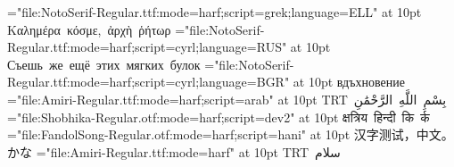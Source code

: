 \font\gr="file:NotoSerif-Regular.ttf:mode=harf;script=grek;language=ELL" at 10pt
\hbox{\gr Καλημέρα κόσμε, ἀρχὴ ῥήτωρ}
\font\cy="file:NotoSerif-Regular.ttf:mode=harf;script=cyrl;language=RUS" at 10pt
\hbox{\cy Съешь же ещё этих мягких булок}
\font\bg="file:NotoSerif-Regular.ttf:mode=harf;script=cyrl;language=BGR" at 10pt
\hbox{\bg вдъхновение}
\font\ara="file:Amiri-Regular.ttf:mode=harf;script=arab" at 10pt
\hbox{\ara\textdir TRT بِسْمِ اللَّهِ الرَّحْمَٰنِ}
\font\dev="file:Shobhika-Regular.otf:mode=harf;script=dev2" at 10pt
\hbox{\dev क्षत्रिय हिन्दी कि र्क}
\font\han="file:FandolSong-Regular.otf:mode=harf;script=hani" at 10pt
\hbox{\han 汉字测试，中文。かな}
\font\nos="file:Amiri-Regular.ttf:mode=harf" at 10pt
\hbox{\nos\textdir TRT سلام}

